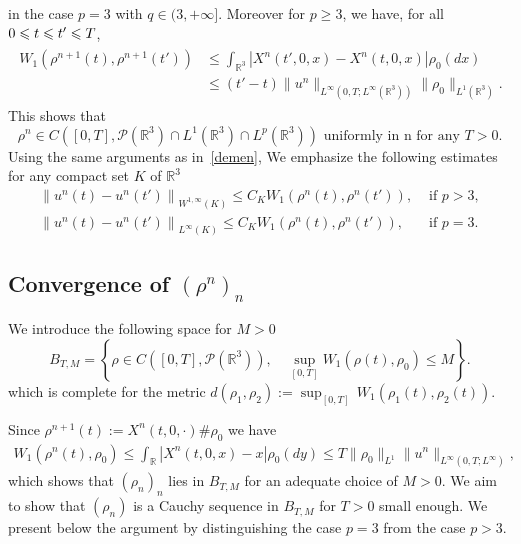 \documentclass[10pt]{amsart}
\theoremstyle{definition}\newtheorem{defi}[theo]{Definition}\newtheorem{rema}[theo]{Remark}\newtheorem{exam}[theo]{Example}\newtheorem{exem}[theo]{Example}\newtheorem{nota}[theo]{Notation}
\newcommand{\R}{\mathbb{R}}
\newcommand{\clP}{\mathcal{P}}
\renewcommand{\leq}{\leqslant}
\renewcommand{\geq}{\geqslant}
\begin{document}
in the case $p=3$ with $q\in(3,+\infty]$. Moreover for $p\geq3$, we have, for all $0 \leq t \leq t'\linebreak \leq T$,
\begin{align}\label{continuite_rho_n}
\begin{split}
W_1\left(\rho^{n+1}(t),\rho^{n+1}(t')\right) &\leq \int_{\R^3}\left|X^n(t',0,x)-X^n(t,0,x)\right| \rho_0(dx)\\
&\leq (t'-t) \|u^n\|_{L^\infty\left(0,T;L^\infty(\R^3)\right)} \|\rho_0\|_{L^1(\R^3)}.
\end{split}
\end{align}
This shows that
\[
\rho^{n} \in C\left([0,T],\clP\left(\R^3\right)\cap L^1\left(\R^3\right)\cap L^p\left(\R^3\right)\right) \text{ uniformly in n for any }T>0.
\]
Using the same arguments as in~\eqref{demen}, We emphasize the following estimates for any compact set $K$ of $\R^3$
\begin{align}
\left\|u^n(t)-u^n(t')\right\|_{W^{1,\infty}(K)}\leq C_K W_1\left(\rho^n(t),\rho^n(t')\right),& \text{ if } p>3,\label{equiconinuity_u^n(t),p>3}
\\
\left\|u^n(t)-u^n(t')\right\|_{L^{\infty}(K)}\leq C_K W_1\left(\rho^n(t),\rho^n(t')\right),& \text{ if } p=3 \label{equiconinuity_u^n(t),p=3}
.
\end{align}

\subsection{Convergence of \texorpdfstring{$(\rho^n)_{n}$}{(rhon)n}}

We introduce the following space for $M>0$
\begin{equation*}
B_{T,M}=\left\{\rho \in C\left([0,T], \clP\left(\R^3\right)\right), \quad
\underset{[0,T]}{\sup}W_1(\rho(t),\rho_0) \leq M \right\}.
\end{equation*}
which is complete for the metric $d(\rho_1,\rho_2):={\sup}_{[0,T]}\,W_1(\rho_1(t),\rho_2(t)) $.

Since $\rho^{n+1}(t):=X^n(t,0,\cdot)\#\rho_0 $ we have
\begin{align*}
W_1\left(\rho^n(t),\rho_0\right) \leq \int_{\R}|X^n(t,0,x)-x|\rho_0(dy) \leq T \|\rho_0\|_{L^1} \|u^n \|_{L^\infty(0,T;L^\infty)},
\end{align*}
which shows that $(\rho_n)_n$ lies in $B_{T,M}$ for an adequate choice of $M>0$. We aim to show that $(\rho_n)$ is a Cauchy sequence in $B_{T,M}$ for $T>0$ small enough. We present below the argument by distinguishing the case $p=3$ from the case $p>3$.
\end{document}
